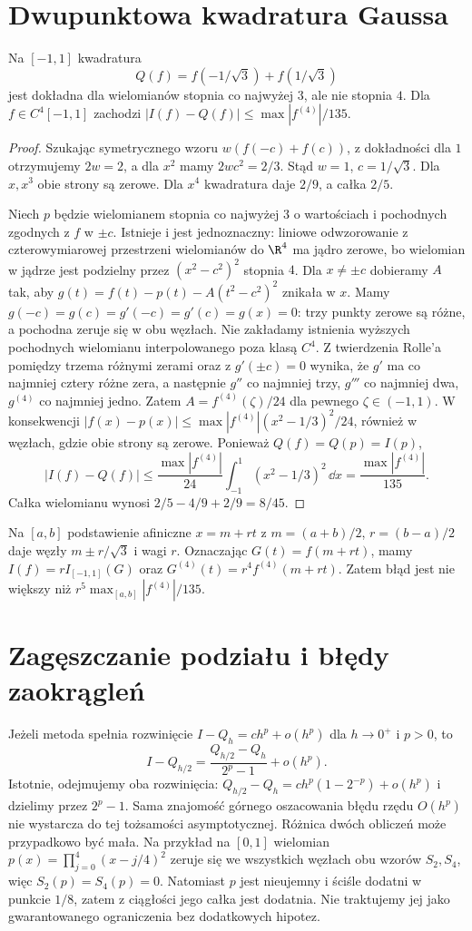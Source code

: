 \section{Dwupunktowa kwadratura Gaussa}
\begin{twierdzenie}
\label{ma1:thm:gauss-two-point}
Na $[-1,1]$ kwadratura
\[
 Q(f)=f(-1/\sqrt3)+f(1/\sqrt3)
\]
jest dokładna dla wielomianów stopnia co najwyżej $3$, ale nie stopnia $4$. Dla $f\in C^4[-1,1]$ zachodzi $|I(f)-Q(f)|\le\max|f^{(4)}|/135$.
\end{twierdzenie}
\begin{proof}
Szukając symetrycznego wzoru $w(f(-c)+f(c))$, z dokładności dla $1$ otrzymujemy $2w=2$, a dla $x^2$ mamy $2wc^2=2/3$. Stąd $w=1$, $c=1/\sqrt3$. Dla $x,x^3$ obie strony są zerowe. Dla $x^4$ kwadratura daje $2/9$, a całka $2/5$.

Niech $p$ będzie wielomianem stopnia co najwyżej $3$ o wartościach i pochodnych zgodnych z $f$ w $\pm c$. Istnieje i jest jednoznaczny: liniowe odwzorowanie z czterowymiarowej przestrzeni wielomianów do $\R^4$ ma jądro zerowe, bo wielomian w jądrze jest podzielny przez $(x^2-c^2)^2$ stopnia $4$. Dla $x\ne\pm c$ dobieramy $A$ tak, aby $g(t)=f(t)-p(t)-A(t^2-c^2)^2$ znikała w $x$. Mamy $g(-c)=g(c)=g'(-c)=g'(c)=g(x)=0$: trzy punkty zerowe są różne, a pochodna zeruje się w obu węzłach. Nie zakładamy istnienia wyższych pochodnych wielomianu interpolowanego poza klasą $C^4$. Z twierdzenia Rolle'a pomiędzy trzema różnymi zerami oraz z $g'(\pm c)=0$ wynika, że $g'$ ma co najmniej cztery różne zera, a następnie $g''$ co najmniej trzy, $g'''$ co najmniej dwa, $g^{(4)}$ co najmniej jedno. Zatem $A=f^{(4)}(\zeta)/24$ dla pewnego $\zeta\in(-1,1)$. W konsekwencji
$|f(x)-p(x)|\le\max|f^{(4)}|(x^2-1/3)^2/24$, również w węzłach, gdzie obie strony są zerowe.
Ponieważ $Q(f)=Q(p)=I(p)$,
\[
 |I(f)-Q(f)|\le\frac{\max|f^{(4)}|}{24}
 \int_{-1}^1(x^2-1/3)^2\,\dd x=\frac{\max|f^{(4)}|}{135}.
\]
Całka wielomianu wynosi $2/5-4/9+2/9=8/45$.
\end{proof}
Na $[a,b]$ podstawienie afiniczne $x=m+rt$ z $m=(a+b)/2$, $r=(b-a)/2$ daje węzły $m\pm r/\sqrt3$ i wagi $r$. Oznaczając $G(t)=f(m+rt)$, mamy $I(f)=rI_{[-1,1]}(G)$ oraz $G^{(4)}(t)=r^4 f^{(4)}(m+rt)$. Zatem błąd jest nie większy niż $r^5\max_{[a,b]}|f^{(4)}|/135$.

\section{Zagęszczanie podziału i błędy zaokrągleń}
Jeżeli metoda spełnia rozwinięcie $I-Q_h=c h^p+o(h^p)$ dla $h\to0^+$ i $p>0$, to
\[
 I-Q_{h/2}=\frac{Q_{h/2}-Q_h}{2^p-1}+o(h^p).
\]
Istotnie, odejmujemy oba rozwinięcia: $Q_{h/2}-Q_h=c h^p(1-2^{-p})+o(h^p)$ i dzielimy przez $2^p-1$. Sama znajomość górnego oszacowania błędu rzędu $O(h^p)$ nie wystarcza do tej tożsamości asymptotycznej. Różnica dwóch obliczeń może przypadkowo być mała. Na przykład na $[0,1]$ wielomian $p(x)=\prod_{j=0}^4(x-j/4)^2$ zeruje się we wszystkich węzłach obu wzorów $S_2,S_4$, więc $S_2(p)=S_4(p)=0$. Natomiast $p$ jest nieujemny i ściśle dodatni w punkcie $1/8$, zatem z ciągłości jego całka jest dodatnia. Nie traktujemy jej jako gwarantowanego ograniczenia bez dodatkowych hipotez.

